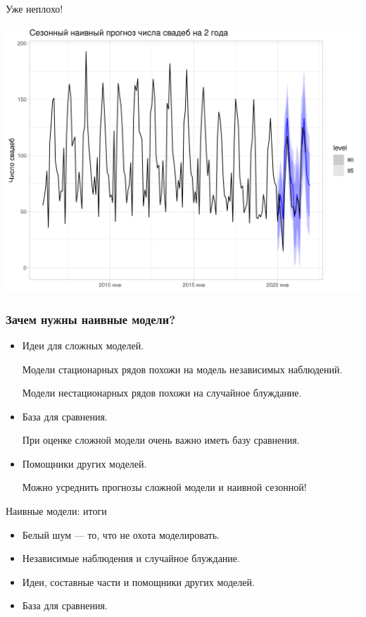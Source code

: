 \begin{frame}{Уже неплохо!}

  \includegraphics[width=\textwidth]{pictures/om_ts_01-162.png}


\end{frame}


\begin{frame}
  \frametitle{Зачем нужны наивные модели?}

  \begin{itemize}[<+->]
    \item \alert{Идеи} для сложных моделей.
    
    Модели \alert{стационарных рядов} похожи на модель независимых наблюдений. 

    Модели \alert{нестационарных рядов} похожи на случайное блуждание. 

    \item \alert{База для сравнения}. 
    
    При оценке сложной модели очень важно иметь базу сравнения. 

    \item \alert{Помощники} других моделей. 
    
    Можно \alert{усреднить прогнозы} сложной модели и наивной сезонной!
  \end{itemize}
  

\end{frame}

\begin{frame}{Наивные модели: итоги}

  \begin{itemize}[<+->]
    \item Белый шум — то, что не охота моделировать. 
    \item Независимые наблюдения и случайное блуждание.
    \item Идеи, составные части и помощники других моделей.
    \item База для сравнения.
  \end{itemize}
\end{frame}

